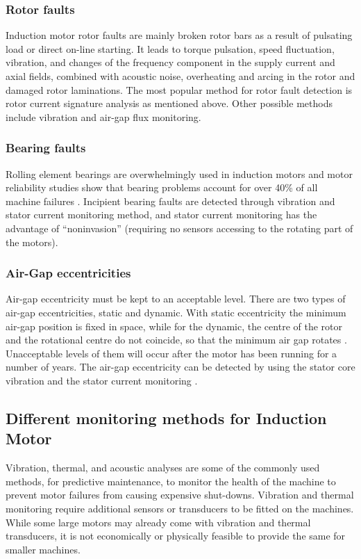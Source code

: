 \documentclass[a4paper,11pt]{report}
\begin{document}
\subsubsection*{Rotor faults} 
Induction motor rotor faults are mainly broken rotor bars as a result of pulsating load or direct on-line starting. It leads to torque pulsation, speed fluctuation, vibration, and changes of the frequency component in the supply current and axial fields, combined with acoustic noise, overheating and arcing in the rotor and damaged rotor laminations. The most popular method for rotor fault detection is rotor current signature analysis as mentioned above. Other possible methods include vibration and air-gap flux monitoring.

\subsubsection*{Bearing faults}
Rolling element bearings are overwhelmingly used in induction motors and motor reliability studies show that bearing problems account for over 40\% of all machine failures \cite{59}. Incipient bearing faults are detected through vibration and stator current monitoring method, and stator current monitoring has the advantage of ``noninvasion'' (requiring no sensors accessing to the rotating part of the motors).

\subsubsection*{Air-Gap eccentricities}
Air-gap eccentricity must be kept to an acceptable level. There are two types of air-gap eccentricities, static and dynamic. With static eccentricity the minimum air-gap position is fixed in space, while for the dynamic, the centre of the rotor and the rotational centre do not coincide, so that the minimum air gap rotates \cite{rps6}. Unacceptable levels of them will occur after the motor has been running for a number of years. The air-gap eccentricity can be detected by using the stator core vibration and the stator current monitoring \cite{rps6}. 

\subsection{Different monitoring methods for Induction Motor}
Vibration, thermal, and acoustic analyses are some of the commonly used methods, for predictive maintenance, to monitor the health of the machine to prevent motor failures from causing expensive shut-downs. Vibration and thermal monitoring require additional sensors or transducers to be fitted on the machines. While some large motors may already come with vibration and thermal transducers, it is not economically or physically feasible to provide the same for smaller machines.
\end{document}
